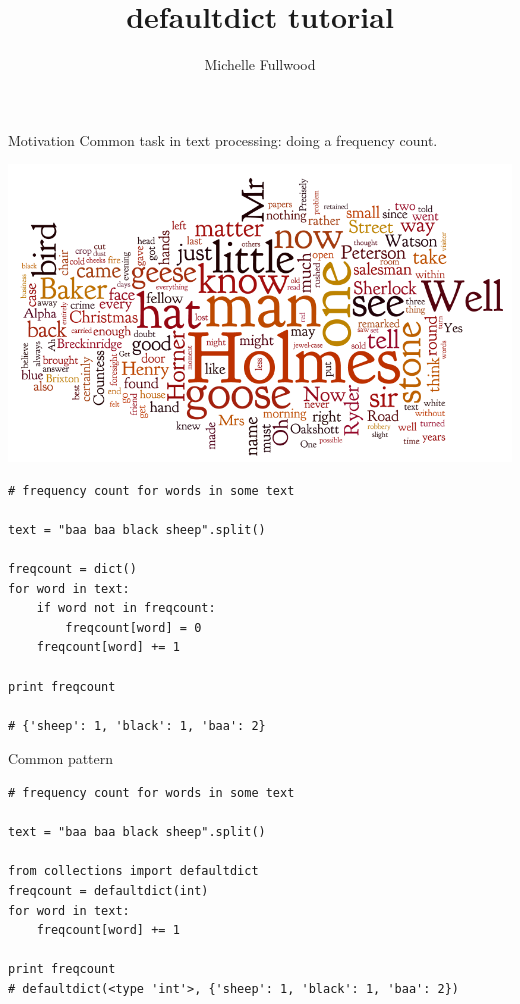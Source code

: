 \documentclass{beamer}
\title[defaultdict]{defaultdict tutorial}
\author{Michelle Fullwood}
\date{}
\begin{document}
\begin{frame}
\titlepage
\end{frame}

\begin{frame}{Motivation}
 Common task in text processing: doing a frequency count.
 
 \includegraphics[scale=0.35]{holmes_wordle.png} 
\end{frame}

\begin{lrbox}{\mysavebox}
\begin{lstlisting}
# frequency count for words in some text

text = "baa baa black sheep".split()

freqcount = dict()
for word in text:
    if word not in freqcount:
        freqcount[word] = 0
    freqcount[word] += 1

print freqcount

# {'sheep': 1, 'black': 1, 'baa': 2}

\end{lstlisting}
\end{lrbox}

\begin{frame}{Common pattern}
\vspace{1.5em}
{\usebox{\mysavebox}}
\vspace{1em}
\end{frame}


\begin{lrbox}{\mysavebox}
\begin{lstlisting}
# frequency count for words in some text

text = "baa baa black sheep".split()

from collections import defaultdict
freqcount = defaultdict(int)
for word in text:
    freqcount[word] += 1

print freqcount
# defaultdict(<type 'int'>, {'sheep': 1, 'black': 1, 'baa': 2})
\end{lstlisting}

\end{lrbox}
\end{document}
